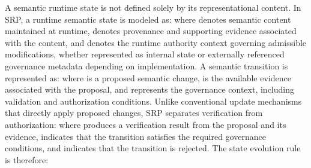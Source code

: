 {}
\markdownRendererSectionEnd 
\markdownRendererSectionEnd \markdownRendererSectionBegin
{}\markdownRendererInterblockSeparator
{}\markdownRendererSectionBegin
{}\markdownRendererInterblockSeparator
{}A semantic runtime state is not defined solely by its representational content. In SRP, a runtime semantic state is modeled as:\markdownRendererInterblockSeparator
{}\markdownRendererInterblockSeparator
{}where  denotes semantic content maintained at runtime,  denotes provenance and supporting evidence associated with the content, and  denotes the runtime authority context governing admissible modifications, whether represented as internal state or externally referenced governance metadata depending on implementation.\markdownRendererParagraphSeparator
{}A semantic transition is represented as:\markdownRendererInterblockSeparator
{}\markdownRendererInterblockSeparator
{}where  is a proposed semantic change,  is the available evidence associated with the proposal, and  represents the governance context, including validation and authorization conditions.\markdownRendererParagraphSeparator
{}Unlike conventional update mechanisms that directly apply proposed changes, SRP separates verification from authorization:\markdownRendererInterblockSeparator
{}\markdownRendererInterblockSeparator
{}where  produces a verification result from the proposal and its evidence,  indicates that the transition satisfies the required governance conditions, and  indicates that the transition is rejected.\markdownRendererParagraphSeparator
{}The state evolution rule is therefore:\markdownRendererInterblockSeparator
{}\markdownRendererInterblockSeparator
